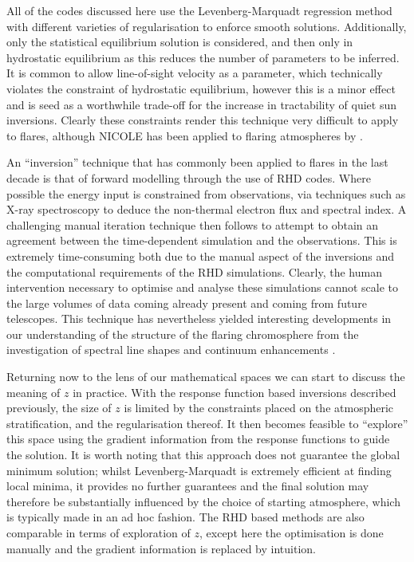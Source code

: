 All of the codes discussed here use the Levenberg-Marquadt regression method with different varieties of regularisation to enforce smooth solutions.
Additionally, only the statistical equilibrium solution is considered, and then only in hydrostatic equilibrium as this reduces the number of parameters to be inferred.
It is common to allow line-of-sight velocity as a parameter, which technically violates the constraint of hydrostatic equilibrium, however this is a minor effect and is seed as a worthwhile trade-off for the increase in tractability of quiet sun inversions.
Clearly these constraints render this technique very difficult to apply to flares, although NICOLE has been applied to flaring atmospheres by \citet{Kuridze2018}.

An ``inversion'' technique that has commonly been applied to flares in the last decade is that of forward modelling through the use of RHD codes.
Where possible the energy input is constrained from observations, via techniques such as X-ray spectroscopy to deduce the non-thermal electron flux and spectral index.
A challenging manual iteration technique then follows to attempt to obtain an agreement between the time-dependent simulation and the observations.
This is extremely time-consuming both due to the manual aspect of the inversions and the computational requirements of the RHD simulations.
Clearly, the human intervention necessary to optimise and analyse these simulations cannot scale to the large volumes of data coming already present and coming from future telescopes.
This technique has nevertheless yielded interesting developments in our understanding of the structure of the flaring chromosphere from the investigation of spectral line shapes and continuum enhancements \citep{Kuridze2015,RubioDaCosta2016, Kowalski2017,Simoes2017}.

Returning now to the lens of our mathematical spaces we can start to discuss the meaning of $z$ in practice.
With the response function based inversions described previously, the size of $z$ is limited by the constraints placed on the atmospheric stratification, and the regularisation thereof.
It then becomes feasible to ``explore'' this space using the gradient information from the response functions to guide the solution.
It is worth noting that this approach does not guarantee the global minimum solution; whilst Levenberg-Marquadt is extremely efficient at finding local minima, it provides no further guarantees and the final solution may therefore be substantially influenced by the choice of starting atmosphere, which is typically made in an ad hoc fashion.
The RHD based methods are also comparable in terms of exploration of $z$, except here the optimisation is done manually and the gradient information is replaced by intuition.

